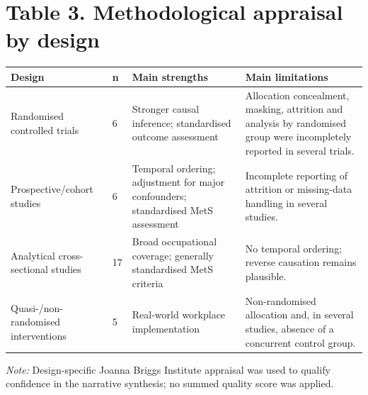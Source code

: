 \section*{Table 3. Methodological appraisal by design}

\begin{tabular}{p{} p{} p{} p{}}
\toprule
Design & n & Main strengths & Main limitations \\
\midrule
Randomised controlled trials & 6 & Stronger causal inference; standardised outcome assessment & Allocation concealment, masking, attrition and analysis by randomised group were incompletely reported in several trials. \\
Prospective/cohort studies & 6 & Temporal ordering; adjustment for major confounders; standardised MetS assessment & Incomplete reporting of attrition or missing-data handling in several studies. \\
Analytical cross-sectional studies & 17 & Broad occupational coverage; generally standardised MetS criteria & No temporal ordering; reverse causation remains plausible. \\
Quasi-/non-randomised interventions & 5 & Real-world workplace implementation & Non-randomised allocation and, in several studies, absence of a concurrent control group. \\
\bottomrule
\end{tabular}

\vspace{0.5em}
\noindent\textit{Note:} Design-specific Joanna Briggs Institute appraisal was used to qualify confidence in the narrative synthesis; no summed quality score was applied.